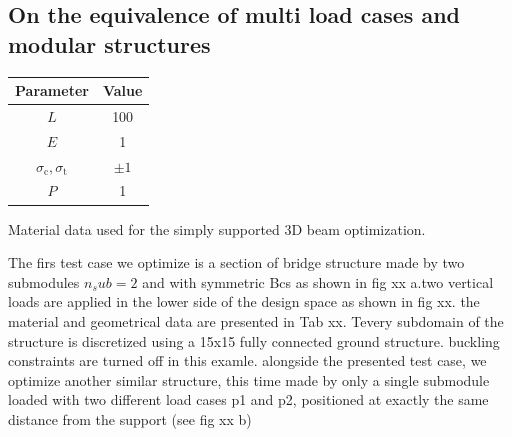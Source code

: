 \subsection{On the equivalence of multi load cases and modular structures}
\begin{margintable}
    \small
    \centering
    \begin{tabular}{cc}
    \toprule
    \textbf{Parameter}        & \textbf{Value} \\ \midrule
    $L$              & 100     \\
    $E$              & 1     \\
    $\sigma_\text{c}, \sigma_\text{t}$ & $\pm 1$\\
    $P$              & 1   \\
    \bottomrule
    \end{tabular}
    \caption{Material data used for the simply supported 3D beam optimization.}
    \label{tab:05}
\end{margintable}
The firs test case we optimize is a section of bridge structure made by two submodules $n_sub=2$ and with symmetric Bcs as shown in fig xx a.two vertical loads are applied in the lower side of the design space as shown in fig xx. the material and geometrical data are presented in Tab xx. Tevery subdomain of the structure is discretized using a 15x15 fully connected ground structure. buckling constraints are turned off in this examle. alongside the presented test case, we optimize another similar structure, this time made by only a single submodule loaded with two different load cases p1 and p2, positioned at exactly the same distance from the support (see fig xx b)
\begin{figure}[]
    \hspace*{\fill}
    \hfill
    \hspace*{\fill}
    \caption{}
    \label{fig:05_cell_multi_eq_bcs}
\end{figure}

